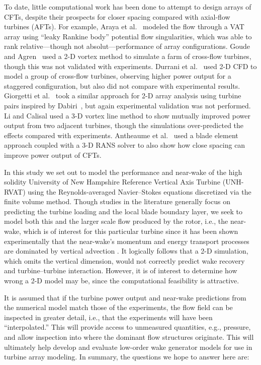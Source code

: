 \documentclass[aip,graphicx]{revtex4-1}
\begin{document}
To date, little computational work has been done to attempt to design arrays of
CFTs, despite their prospects for closer spacing compared with axial-flow
turbines (AFTs). For example, Araya et al.~\cite{Araya2014} modeled the flow
through a VAT array using ``leaky Rankine body'' potential flow singularities,
which was able to rank relative---though not absolut---performance of array
configurations. Goude and Agren~\cite{Goude2010} used a 2-D vortex method to
simulate a farm of cross-flow turbines, though this was not validated with
experiments. Durrani et al.~\cite{Durrani2011} used 2-D CFD to model a
group of cross-flow turbines, observing higher power output for a staggered
configuration, but also did not compare with experimental results. Giorgetti
et al.~\cite{Giorgetti2015} took a similar approach for 2-D array analysis using
turbine pairs inspired by Dabiri~\cite{Dabiri2011}, but again experimental
validation was not performed. Li and Calisal \cite{Li2010} used a 3-D vortex
line method to show mutually improved power output from two adjacent turbines,
though the simulations over-predicted the effects compared with experiments.
Antheaume et al.~\cite{Antheaume2008} used a blade element approach
coupled with a 3-D RANS solver to also show how close spacing can improve power
output of CFTs.

In this study we set out to model the performance and near-wake of the high
solidity University of New Hampshire Reference Vertical Axis Turbine (UNH-RVAT)
using the Reynolds-averaged Navier--Stokes equations discretized via the finite
volume method. Though studies in the literature generally focus on predicting
the turbine loading and the local blade boundary layer, we seek to model both
this and the larger scale flow produced by the rotor, i.e., the near-wake, which
is of interest for this particular turbine since it has been shown
experimentally that the near-wake's momentum and energy transport processes are
dominated by vertical advection \cite{Bachant2015-JoT}. It logically follows
that a 2-D simulation, which omits the vertical dimension, would not correctly
predict wake recovery and turbine--turbine interaction. However, it is of
interest to determine how wrong a 2-D model may be, since the computational
feasibility is attractive.

It is assumed that if the turbine power output and near-wake predictions from
the numerical model match those of the experiments, the flow field can be
inspected in greater detail, i.e., that the experiments will have been
``interpolated.'' This will provide access to unmeasured quantities, e.g.,
pressure, and allow inspection into where the dominant flow structures
originate. This will ultimately help develop and evaluate low-order wake
generator models for use in turbine array modeling. In summary, the questions we
hope to answer here are:
\end{document}
